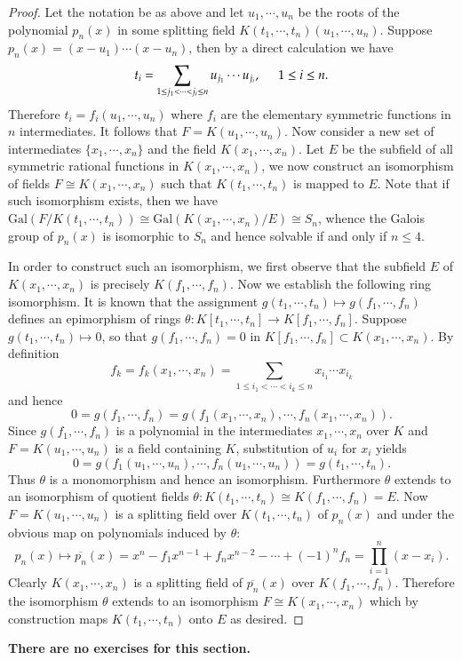 \begin{proof}
Let the notation be as above and let $u_1,\cdots,u_n$ be the roots of the polynomial $p_n(x)$ in some splitting field $K(t_1,\cdots,t_n)(u_1,\cdots,u_n)$. Suppose $p_n(x)=(x-u_1)\cdots(x-u_n)$, then by a direct calculation we have 
$$
t_i=\sum_{1\le j_1<\cdots <j_i\le n}{u_{j_1}\cdots u_{j_i}},\hspace{0.5cm}1\le i\le n.
$$
Therefore $t_i=f_i(u_1,\cdots,u_n)$ where $f_i$ are the elementary symmetric functions in $n$ intermediates. It follows that $F=K(u_1,\cdots,u_n)$. Now consider a new set of intermediates $\{x_1,\cdots,x_n\}$ and the field $K(x_1,\cdots,x_n)$. Let $E$ be the subfield of all symmetric rational functions in $K(x_1,\cdots,x_n)$, we now construct an isomorphism of fields $F\cong K(x_1,\cdots,x_n)$ such that $K(t_1,\cdots,t_n)$ is mapped to $E$. Note that if such isomorphism exists, then we have $\mathrm{Gal}(F/K(t_1,\cdots,t_n))\cong\mathrm{Gal}(K(x_1,\cdots,x_n)/E)\cong S_n$, whence the Galois group of $p_n(x)$ is isomorphic to $S_n$ and hence solvable if and only if $n\le 4$.\par
In order to construct such an isomorphism, we first observe that the subfield $E$ of $K(x_1,\cdots,x_n)$ is precisely $K(f_1,\cdots,f_n)$. Now we establish the following ring isomorphism. It is known that the assignment $g(t_1,\cdots,t_n)\mapsto g(f_1,\cdots,f_n)$ defines an epimorphism of rings $\theta:K[t_1,\cdots,t_n]\to K[f_1,\cdots,f_n]$. Suppose $g(t_1,\cdots,t_n)\mapsto 0$, so that $g(f_1,\cdots,f_n)=0$ in $K[f_1,\cdots,f_n]\subset K(x_1,\cdots,x_n)$. By definition 
$$
f_k=f_k\left( x_1,\cdots ,x_n \right) =\sum_{1\le i_1<\cdots <i_k\le n}{x_{i_1}\cdots x_{i_k}}
$$
and hence 
$$
0=g\left( f_1,\cdots ,f_n \right) =g\left( f_1\left( x_1,\cdots ,x_n \right) ,\cdots ,f_n\left( x_1,\cdots ,x_n \right) \right) .
$$
Since $g(f_1,\cdots,f_n)$ is a polynomial in the intermediates $x_1,\cdots,x_n$ over $K$ and $F=K(u_1,\cdots,u_n)$ is a field containing $K$, substitution of $u_i$ for $x_i$ yields
$$
0=g\left( f_1\left( u_1,\cdots ,u_n \right) ,\cdots ,f_n\left( u_1,\cdots ,u_n \right) \right) =g\left( t_1,\cdots ,t_n \right) .
$$
Thus $\theta$ is a monomorphism and hence an isomorphism. Furthermore $\theta$ extends to an isomorphism of quotient fields $\theta:K(t_1,\cdots,t_n)\cong K(f_1,\cdots,f_n)=E$. Now $F=K(u_1,\cdots,u_n)$ is a splitting field over $K(t_1,\cdots,t_n)$ of $p_n(x)$ and under the obvious map on polynomials induced by $\theta$: 
$$
p_n\left( x \right) \mapsto \overline{p_n}\left( x \right) =x^n-f_1x^{n-1}+f_nx^{n-2}-\cdots +\left( -1 \right) ^nf_n=\prod_{i=1}^n{\left( x-x_i \right)}.
$$
Clearly $K(x_1,\cdots,x_n)$ is a splitting field of $\overline{p_n}(x)$ over $K(f_1,\cdots,f_n)$. Therefore the isomorphism $\theta$ extends to an isomorphism $F\cong K(x_1,\cdots,x_n)$ which by construction maps $K(t_1,\cdots,t_n)$ onto $E$ as desired.
\end{proof}
\textbf{There are no exercises for this section.}